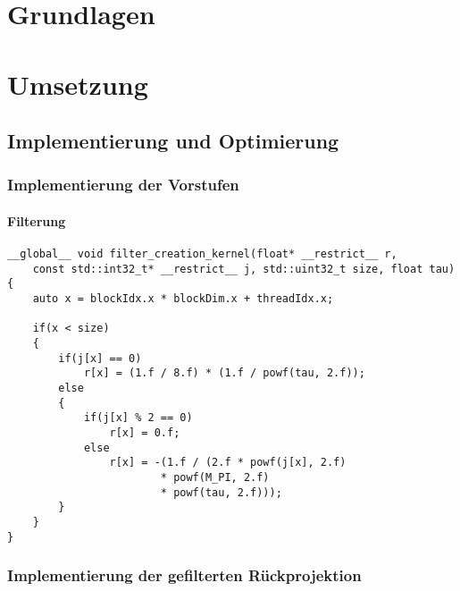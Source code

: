 \appendix

\chapter{Grundlagen}

\chapter{Umsetzung}

\section{Implementierung und Optimierung}

\subsection{Implementierung der Vorstufen}

\subsubsection{Filterung}

\begin{code}
\begin{verbatim}
__global__ void filter_creation_kernel(float* __restrict__ r,
    const std::int32_t* __restrict__ j, std::uint32_t size, float tau)
{
    auto x = blockIdx.x * blockDim.x + threadIdx.x;

    if(x < size)
    {
        if(j[x] == 0)
            r[x] = (1.f / 8.f) * (1.f / powf(tau, 2.f));
        else
        {
            if(j[x] % 2 == 0)
                r[x] = 0.f;
            else
                r[x] = -(1.f / (2.f * powf(j[x], 2.f)
                        * powf(M_PI, 2.f)
                        * powf(tau, 2.f)));
        }
    }
}
\end{verbatim}
\label{app:filter_gen}
\end{code}

\begin{code}
\label{app:filter_norm}
\end{code}

\subsection{Implementierung der gefilterten Rückprojektion}

